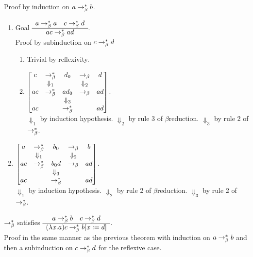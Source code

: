 \documentclass{article}
\begin{document}
\begin{theorem}
Proof by induction on $a \to^*_\beta b$.
\begin{enumerate}
\item
  Goal $\begin{array}{c} 
    a  \to^*_\beta a \quad
    c  \to^*_\beta d \\ \hline ac \to^*_\beta ad\end{array}$.\\
  Proof by subinduction on $c \to^*_\beta d$
  \begin{enumerate}
  \item
    Trivial by reflexivity.
  \item
    $\begin{bmatrix}
      c   & \to^*_\beta      &  d_0  & \to_\beta            &   d   \\
           & \Downarrow_1 &         & \Downarrow_2 &        \\
      ac & \to^*_\beta    & ad_0 & \to_\beta              &   ad \\
          &                       & \Downarrow_3 &           &        \\
      ac &                      & \to^*_\beta   &              &   ad
    \end{bmatrix}$.\\
    $\Downarrow_1$ by induction hypothesis.
    $\Downarrow_2$ by rule 3 of $\beta$reduction.
    $\Downarrow_3$ by rule 2 of $\to^*_\beta$.
  \end{enumerate}
  \item
    $\begin{bmatrix}
      a   & \to^*_\beta      &  b_0  & \to_\beta            &   b   \\
           & \Downarrow_1 &         & \Downarrow_2 &        \\
      ac & \to^*_\beta      & b_0d & \to_\beta            &   ad \\
           &                        & \Downarrow_3 &         &        \\
      ac &                         & \to^*_\beta   &           &   ad
    \end{bmatrix}$.\\
    $\Downarrow_1$ by induction hypothesis.
    $\Downarrow_2$ by rule 2 of $\beta$reduction.
    $\Downarrow_3$ by rule 2 of $\to^*_\beta$.
  \end{enumerate}
\end{theorem}




\begin{theorem}
  $\to^*_\beta$ satisfies
  $\begin{array}{c} 
    a\to^*_\beta b \quad
    c \to^*_\beta d \\ \hline (\lambda x.a)c \to^*_\beta b[x:=d]\end{array}$.
  \\ Proof in the same manner as the previous theorem with induction on
  $a\to^*_\beta b$ and then a subinduction on $c \to^*_\beta d$ for the
  reflexive case.
\end{theorem}
\end{document}
